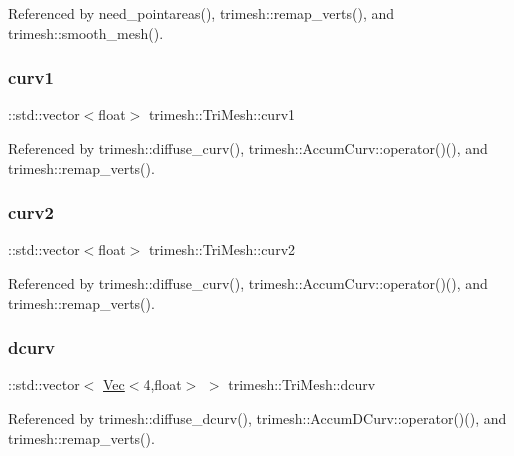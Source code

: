 Referenced by need\+\_\+pointareas(), trimesh\+::remap\+\_\+verts(), and trimesh\+::smooth\+\_\+mesh().

\mbox{\label{classtrimesh_1_1TriMesh_a7327e090de6f6171fd662b48c08a33b1}} 
\subsubsection{\texorpdfstring{curv1}{curv1}}
{\footnotesize\ttfamily \+::std\+::vector$<$float$>$ trimesh\+::\+Tri\+Mesh\+::curv1}



Referenced by trimesh\+::diffuse\+\_\+curv(), trimesh\+::\+Accum\+Curv\+::operator()(), and trimesh\+::remap\+\_\+verts().

\mbox{\label{classtrimesh_1_1TriMesh_afbeb68c068830359351e0f30a05eab7e}} 
\subsubsection{\texorpdfstring{curv2}{curv2}}
{\footnotesize\ttfamily \+::std\+::vector$<$float$>$ trimesh\+::\+Tri\+Mesh\+::curv2}



Referenced by trimesh\+::diffuse\+\_\+curv(), trimesh\+::\+Accum\+Curv\+::operator()(), and trimesh\+::remap\+\_\+verts().

\mbox{\label{classtrimesh_1_1TriMesh_a120989b0b99ce133572bb32cd41befa6}} 
\subsubsection{\texorpdfstring{dcurv}{dcurv}}
{\footnotesize\ttfamily \+::std\+::vector$<$ \hyperlink{classtrimesh_1_1Vec}{Vec}$<$4,float$>$ $>$ trimesh\+::\+Tri\+Mesh\+::dcurv}



Referenced by trimesh\+::diffuse\+\_\+dcurv(), trimesh\+::\+Accum\+D\+Curv\+::operator()(), and trimesh\+::remap\+\_\+verts().

